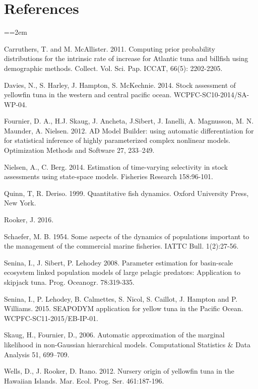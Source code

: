 \documentclass[12pt,letterpaper]{article}
\newcommand\doublespacing{\baselineskip=1.6\normalbaselineskip}
\begin{document}
\section*{References}
{\parindent=0cm \small
\everypar={\hangindent=2em }\par
Carruthers, T. and M. McAllister. 2011.
Computing prior probability distributions for the
intrinsic rate of increase for Atlantic tuna and
billfish using demographic methods.
Collect. Vol. Sci. Pap. ICCAT, 66(5): 2202-2205.

Davies, N., S. Harley, J. Hampton, S. McKechnie. 2014. Stock
assessment of yellowfin tuna in the western and central pacific ocean.
WCPFC-SC10-2014/SA-WP-04.

Fournier, D. A., H.J. Skaug, J. Ancheta, J.Sibert, J. Ianelli, 
A. Magnusson, M. N. Maunder, A. Nielsen. 2012. AD Model Builder:
using automatic differentiation for for statistical inference of highly
parameterized complex nonlinear models. Optimization Methods and
Software 27, 233–249.

Nielsen, A., C. Berg. 2014. Estimation of time-varying selectivity
in stock assessments using state-space models. Fisheries Research
158:96-101.


Quinn, T, R. Deriso. 1999. Quantitative fish dynamics. Oxford
University Press, New York.

Rooker, J. 2016.

Schaefer, M. B. 1954. Some aspects of the dynamics of populations
important to the management of the commercial marine fisheries. IATTC
Bull. 1(2):27-56.

Senina, I., J. Sibert, P. Lehodey  2008. Parameter estimation for
basin-scale ecosystem linked population models of large pelagic
predators: Application to skipjack tuna.  Prog. Oceanogr. 78:319-335.

Senina, I.,  P. Lehodey, B. Calmettes, S. Nicol, S. Caillot,
J. Hampton and P. Williams. 2015.
SEAPODYM application for yellow tuna in the Pacific Ocean.
WCPFC-SC11-2015/EB-IP-01.


Skaug, H., Fournier, D., 2006. Automatic approximation of the marginal
likelihood in non-Gaussian hierarchical models. Computational
Statistics \& Data Analysis 51, 699–709.

Wells, D., J. Rooker, D. Itano. 2012.  Nursery origin of yellowfin
tuna in the Hawaiian Islands. Mar. Ecol. Prog. Ser. 461:187-196. 
\par}
\end{document}
